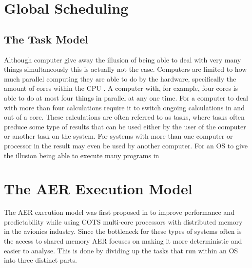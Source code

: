 \documentclass{kththesis}
\begin{document}
\section{Global Scheduling}

\subsection{The Task Model}

Although computer give away the illusion of being able to deal with very many things simultaneously
this is actually not the case. Computers are limited to how much parallel computing they are able to
do by the hardware, specifically the amount of cores within the CPU . A computer with, for example, four cores is able to do at most four things in
parallel at any one time. For a computer to deal with more than four calculations require it to
switch ongoing calculations in and out of a core. These calculations are often referred to as tasks,
where tasks often preduce some type of results that can be used either by the user of the computer
or another task on the system. For systems with more than one computer or processor in the result
may even be used by another computer.  For an OS  to give the illusion being able to
execute many programs in 

\section{The AER Execution Model}

The AER  execution model was first proposed in
\parencite{durrieu_predictable_2014} to improve performance and predictability while using COTS
 multi-core processors with distributed memory in the
avionics industry. Since the bottleneck for these types of systems often is the access to shared
memory AER focuses on making it more deterministic and easier to analyse. This is done by dividing
up the tasks that run within an OS  into three distinct parts.

\end{document}
